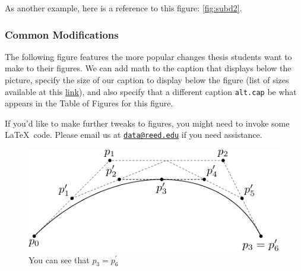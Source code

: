 \documentclass[12pt,twoside]{reedthesis}
\begin{document}
  As another example, here is a reference to this figure:
  \autoref{fig:subd2}.
  
  \subsubsection{Common Modifications}\label{common-modifications-2}
  
  The following figure features the more popular changes thesis students
  want to make to their figures. We can add math to the caption that
  displays below the picture, specify the size of our caption to display
  below the figure (list of sizes available at this
  \href{http://www.emerson.emory.edu/services/latex/latex_169.html\#SEC169}{link}),
  and also specify that a different caption \texttt{alt.cap} be what
  appears in the Table of Figures for this figure.
  
  If you'd like to make further tweaks to figures, you might need to
  invoke some \LaTeX~code. Please email us at
  \href{mailto:data@reed.edu}{\nolinkurl{data@reed.edu}} if you need
  assistance.
  
  \begin{Shaded}
  \begin{Highlighting}[]
  \NormalTok{(}\NormalTok{, }
         \NormalTok{,}
         \CharTok{\textbackslash{}\textbackslash{}}\NormalTok{,}
         \NormalTok{,}
         \NormalTok{)}
  \end{Highlighting}
  \end{Shaded}
  
  \begin{figure}[h!tbp]
  \centering
  \includegraphics[angle = 0,scale = 1]{figure/subdivision.pdf}
  \caption[Subdivision of arc segments]{\footnotesize{You can see that $p_3 = p_6^\prime$}}
  \label{fig:subd3}
  \end{figure}
  
\end{document}
